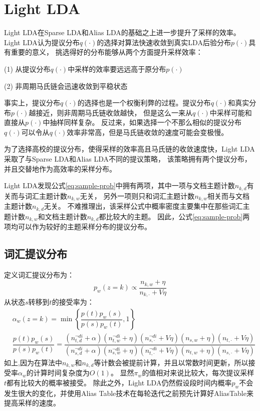 \section{Light LDA}
Light LDA在Sparse LDA和Alias LDA的基础之上进一步提升了采样的效率。
Light LDA认为提议分布$q(\cdot)$的选择对算法快速收敛到真实LDA后验分布$p(\cdot)$具有重要的意义，
挑选得好的分布能够从两个方面提升采样效率：

(1) 从提议分布$q(\cdot)$中采样的效率要远远高于原分布$p(\cdot)$

(2) 非周期马氏链会迅速收敛到平稳状态

事实上，提议分布$q(\cdot)$的选择也是一个权衡利弊的过程。提议分布$q(\cdot)$和真实分布$p(\cdot)$越接近，则非周期马氏链收敛越快，
但是这么一来从$q(\cdot)$中采样可能和直接从$p(\cdot)$中抽样同样复杂。
反过来，如果选择一个不那么相似的提议分布$q(\cdot)$可以令从$q(\cdot)$效率非常高，但是马氏链收敛的速度可能会变极慢。

为了选择高校的提议分布，使得采样的效率高且马氏链的收敛速度快，Light LDA采取了与Sparse LDA和Alias LDA不同的提议策略，
该策略拥有两个提议分布，并且交替地作为高效率的采样分布。

Light LDA发现公式\ref{eq:sample-prob}中拥有两项，其中一项与文档主题计数$n_{k,d}$有关而与词汇主题计数$n_{k,w}$无关，
另外一项则只和词汇主题计数$n_{k,w}$相关而与文档主题计数$n_{k,d}$无关。
不难推理出，该采样公式中概率密度主要集中在那些词汇主题计数$n_{k,w}$和文档主题计数$n_{k,d}$都比较大的主题。
因此，公式\ref{eq:sample-prob}两项均可以作为较好的主题采样分布的提议分布。

\subsection{词汇提议分布}
定义词汇提议分布为：
\begin{equation}
p_w(z = k) \propto \dfrac{n_{k,w} +\eta}{n_{k, \cdot} + V \eta}
\end{equation}
从状态$s$转移到$t$的接受率为：
\begin{equation}
\begin{aligned}
& \alpha_w(z=k) = \min \left\{\dfrac{p(t) p_w(s)}{p(s)p_w(t)}, 1\right\} \\
& \dfrac{p(t) p_w(s)}{p(s)p_w(t)}= \dfrac{ (n_{t,d}^{\neg di} + \alpha)(n_{t,w}^{\neg di} + \eta) (n_{s,\cdot}^{\neg di} + V \eta) (n_{s,w} + \eta) ( n_{t, \cdot} + V \eta)}
{ (n_{s,d}^{\neg di} + \alpha)(n_{s,w}^{\neg di} + \eta) (n_{t,\cdot}^{\neg di} + V \eta) (n_{t,w} + \eta) ( n_{s, \cdot} + V \eta)}
\end{aligned}
\end{equation}
如上,因为在算法中$n_{k, w}$和$n_{k, d}$等计数会被提前计算，并且以常数时间更新，所以接受率$\alpha_w$的计算时间复杂度为$O(1)$。
显然$\pi_w$的值相对来说比较大，每次提议采样$t$都有比较大的概率被接受。
除此之外，Light LDA仍然假设段时间内概率$p_w$不会发生很大的变化，并使用Alias Table技术在每轮迭代之前预先计算好AliasTable来提高采样的速度。

